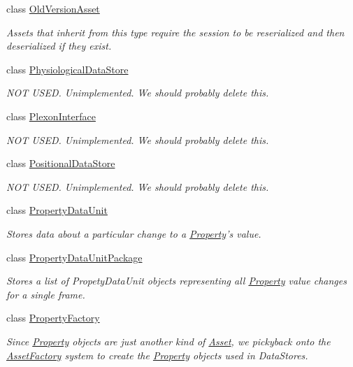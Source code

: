 \begin{DoxyCompactItemize}
class \hyperlink{class_picto_1_1_old_version_asset}{Old\-Version\-Asset}
\begin{DoxyCompactList}\small\item\em Assets that inherit from this type require the session to be reserialized and then deserialized if they exist. \end{DoxyCompactList}\item 
class \hyperlink{class_picto_1_1_physiological_data_store}{Physiological\-Data\-Store}
\begin{DoxyCompactList}\small\item\em N\-O\-T U\-S\-E\-D. Unimplemented. We should probably delete this. \end{DoxyCompactList}\item 
class \hyperlink{class_picto_1_1_plexon_interface}{Plexon\-Interface}
\begin{DoxyCompactList}\small\item\em N\-O\-T U\-S\-E\-D. Unimplemented. We should probably delete this. \end{DoxyCompactList}\item 
class \hyperlink{class_picto_1_1_positional_data_store}{Positional\-Data\-Store}
\begin{DoxyCompactList}\small\item\em N\-O\-T U\-S\-E\-D. Unimplemented. We should probably delete this. \end{DoxyCompactList}\item 
class \hyperlink{class_picto_1_1_property_data_unit}{Property\-Data\-Unit}
\begin{DoxyCompactList}\small\item\em Stores data about a particular change to a \hyperlink{class_picto_1_1_property}{Property}'s value. \end{DoxyCompactList}\item 
class \hyperlink{class_picto_1_1_property_data_unit_package}{Property\-Data\-Unit\-Package}
\begin{DoxyCompactList}\small\item\em Stores a list of Propety\-Data\-Unit objects representing all \hyperlink{class_picto_1_1_property}{Property} value changes for a single frame. \end{DoxyCompactList}\item 
class \hyperlink{class_picto_1_1_property_factory}{Property\-Factory}
\begin{DoxyCompactList}\small\item\em Since \hyperlink{class_picto_1_1_property}{Property} objects are just another kind of \hyperlink{class_picto_1_1_asset}{Asset}, we pickyback onto the \hyperlink{class_picto_1_1_asset_factory}{Asset\-Factory} system to create the \hyperlink{class_picto_1_1_property}{Property} objects used in Data\-Stores. \end{DoxyCompactList}\item 

\end{DoxyCompactItemize}
